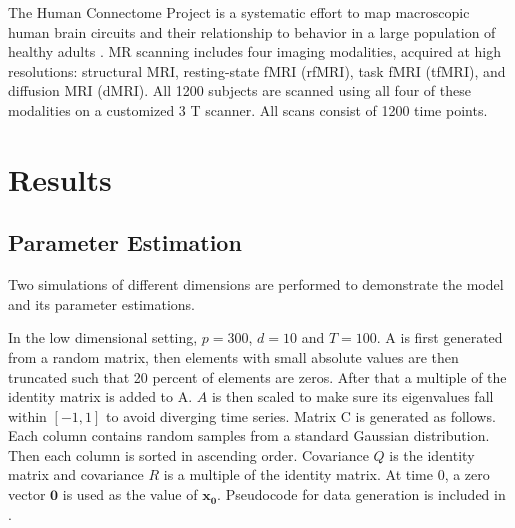 \documentclass[fleqn]{article}
\begin{document}
The Human Connectome Project is a systematic effort to map macroscopic human brain circuits and their relationship to behavior in a large population of healthy adults \cite{van2013wu,moeller2010multiband,feinberg2010multiplexed}. MR scanning includes four imaging modalities, acquired at high resolutions: structural MRI, resting-state fMRI (rfMRI), task fMRI (tfMRI), and diffusion MRI (dMRI). All 1200 subjects are scanned using all four of these modalities on a customized 3 T scanner.  All scans consist of 1200 time points.

\section{Results}
\subsection{Parameter Estimation}
\label{sec:lowdsim}
Two simulations of different dimensions are performed to demonstrate the model and its parameter estimations.

In the low dimensional setting, $p = 300$, $d = 10$ and $T = 100$. A is first generated from a random matrix, then elements with small absolute values are then truncated such that 20 percent of elements are zeros. After that a multiple of the identity matrix is added to A. $A$ is then scaled to make sure its eigenvalues fall within $[-1,1]$ to avoid diverging time series. Matrix C is generated as follows. Each column contains random samples from a standard Gaussian distribution. Then each column is sorted in ascending order. Covariance $Q$ is the identity matrix and covariance $R$ is a multiple of the identity matrix. At time 0, a zero vector $\mathbf{0}$ is used as the value of $\mathbf{x_0}$. Pseudocode for data generation is included in .
\end{document}
